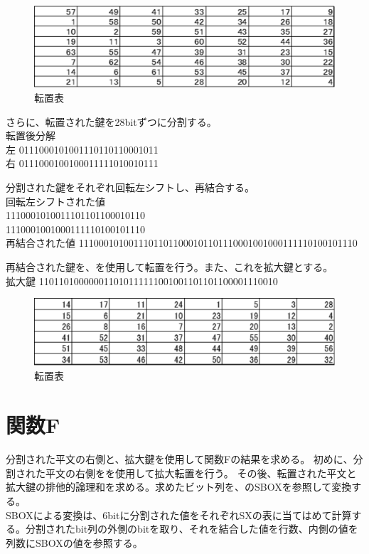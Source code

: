 \documentclass[uplatex]{jsarticle}
\begin{document}
\newpage

\begin{figure}[h]
  \begin{center}
    \includegraphics[width=0.5\linewidth]{pc1.eps}
    \caption{転置表}
    \label{figs1}
  \end{center}
\end{figure}


さらに、転置された鍵を28bitずつに分割する。\\
転置後分解\\
左 0111000101001110110110001011\\
右 0111000100100011111010010111

分割された鍵をそれぞれ回転左シフトし、再結合する。\\
回転左シフトされた値\\
1110001010011101101100010110\\
1110001001000111110100101110\\
再結合された値
11100010100111011011000101101110001001000111110100101110


再結合された鍵を、を使用して転置を行う。また、これを拡大鍵とする。\\
拡大鍵
110110100000011010111111001001101101100001110010

\begin{figure}[h]
  \begin{center}
    \includegraphics[width=0.5\linewidth]{pc2.eps}
    \caption{転置表}
    \label{figs2}
  \end{center}
\end{figure}

\section{関数F}

分割された平文の右側と、拡大鍵を使用して関数Fの結果を求める。
初めに、分割された平文の右側をを使用して拡大転置を行う。
その後、転置された平文と拡大鍵の排他的論理和を求める。求めたビット列を、のSBOXを参照して変換する。\\
SBOXによる変換は、6bitに分割された値をそれぞれSXの表に当てはめて計算する。分割されたbit列の外側のbitを取り、それを結合した値を行数、内側の値を列数にSBOXの値を参照する。
\end{document}
